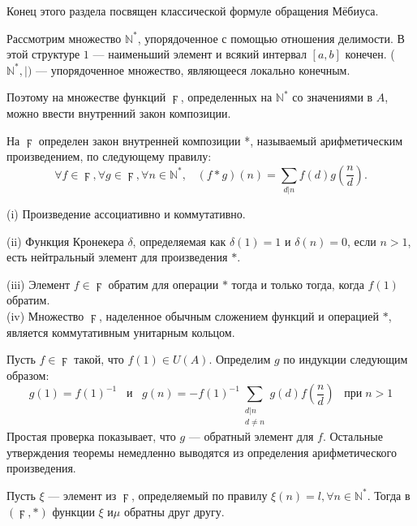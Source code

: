\documentclass{mai_book}
\begin{document}
Конец этого раздела посвящен классической формуле обращения
Мёбиуса.

Рассмотрим множество $\mathbb{N}^*$, упорядоченное с помощью отношения
делимости. В этой структуре $1$ — наименьший элемент и всякий ин­тервал $[a,b]$ конечен. ($\mathbb{N}^*, |)$ — упорядоченное множество, являющееся
локально конечным.

Поэтому на множестве функций $\digamma$, определенных на $\mathbb{N}^*$ со значени­ями в $A$, можно ввести внутренний закон композиции.
\newpage
\begin{determ}
\hspace*{0.5cm}На $\digamma$ определен закон внутренней композиции *, называемый арифметическим произведением, по следующему правилу:
$$\forall f\in\digamma,\forall g\in\digamma,\forall n\in\mathbb{N}^{*},\;\;\;(f*g)(n)=\sum\limits_{d|n}f(d)g\left(\frac{n}{d}\right).$$
\end{determ}
\begin{property}[произведения *]
\hspace*{0.5cm}(i) Произведение ассоциативно и коммутативно.

(ii) Функция Кронекера $\delta$, определяемая как $\delta(1)=1$ и $\delta(n)=0$, если
$n>1$, есть нейтральный элемент для произведения $*$.

(iii) Элемент $f\in\digamma$ обратим для операции $*$ тогда и только тогда,
когда $f(1)$ обратим.\\
(iv) Множество $\digamma$, наделенное обычным сложением функций и операцией $*$, является коммутативным унитарным кольцом.
\end{property}
\begin{myproof}
Пусть $f\in\digamma$ такой, что $f(1)\in U(A)$. Определим $g$ по индукции следующим образом:
$$g(1)=f(1)^{-1}\;\;\;\text{и}\;\;\;g(n)=-f(1)^{-1}\sum_{\substack{d|n{}\\d\neq n}
}g(d)f\left(\frac{n}{d}\right)\;\;\;\text{при}\;n>1$$
Простая проверка показывает, что $g$ — обратный элемент для $f$.
Остальные утверждения теоремы немедленно выводятся из опреде­ления арифметического произведения.
\end{myproof}
\begin{property}
\hspace{0.5cm}Пусть $\xi$ — элемент из $\digamma$, определяемый по правилу $\xi(n)=l,\forall n\in\mathbb{N}^*$. Тогда в $(\digamma,*)$ функции $\xi$ и$\mu$ обратны друг другу.
\end{property}
\end{document}
